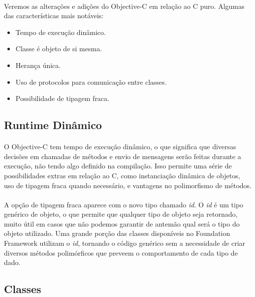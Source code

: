 \documentclass[a4paper,12pt,brazil,doubleside]{book}
\begin{document}
\paragraph{}Veremos as alterações e adições do Objective-C em relação ao C puro. Algumas das características mais notáveis:

\begin{itemize}
\item Tempo de execução dinâmico.
\item Classe é objeto de si mesma.
\item Herança única.
\item Uso de protocolos para comunicação entre classes.
\item Possibilidade de tipagem fraca.
\end{itemize}

\bigskip 
\bigskip

\subsection{Runtime Dinâmico}

\paragraph{}O Objective-C tem tempo de execução dinâmico, o que significa que diversas decisões em chamadas de métodos e envio de mensagens serão feitas durante a execução, não tendo algo definido na compilação. Isso permite uma série de possibilidades extras em relação ao C, como instanciação dinâmica de objetos, uso de tipagem fraca quando necessário, e vantagens no polimorfismo de métodos.
\paragraph{}A opção de tipagem fraca aparece com o novo tipo chamado \textit{id}. O \textit{id} é um tipo genérico de objeto, o que permite que qualquer tipo de objeto seja retornado, muito útil em casos que não podemos garantir de antemão qual será o tipo do objeto utilizado. Uma grande porção das classes disponíveis no Foundation Framework utilizam o \textit{id}, tornando o código genérico sem a necessidade de criar diversos métodos polimórficos que preveem o comportamento de cada tipo de dado.

\bigskip 

\subsection{Classes}
\end{document}
